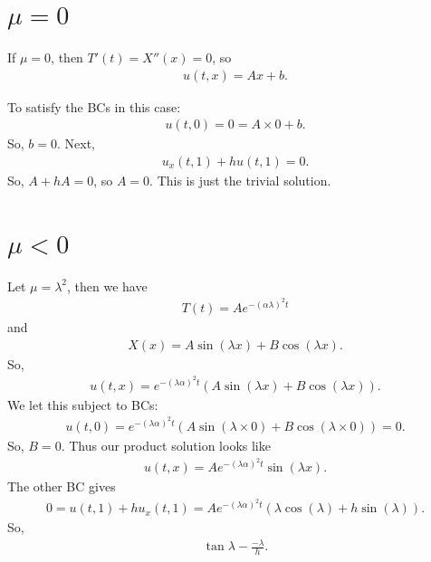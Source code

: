 \documentclass{book}
\theoremstyle{definition}
\begin{document}
\section{$\mu=0$}
If $\mu = 0$, then $T'(t) = X''(x) = 0$, so
\begin{align*}
u(t,x) = Ax+b.
\end{align*}

To satisfy the BCs in this case:
\begin{align*}
u(t,0) = 0 = A\times 0 + b.
\end{align*}
So, $b=0$. Next,
\begin{align*}
u_x(t,1) + hu(t,1) = 0.
\end{align*}
So, $A+hA = 0$, so $A=0$. This is just the trivial solution.

\section{$\mu <0$}
Let $\mu=\lambda^2$, then we have
\begin{align*}
T(t) = Ae^{-(\alpha \lambda)^2t}
\end{align*}
and
\begin{align*}
X(x) = A\sin(\lambda x) + B\cos(\lambda x).
\end{align*}
So,
\begin{align*}
u(t,x) = e^{-(\lambda\alpha)^2t}\left( A\sin(\lambda x) + B\cos(\lambda x) \right).
\end{align*}
We let this subject to BCs:
\begin{align*}
u(t,0) = e^{-(\lambda\alpha)^2t}\left( A\sin(\lambda\times 0) + B\cos(\lambda \times 0) \right) = 0.
\end{align*}
So, $B=0$. Thus our product solution looks like
\begin{align*}
u(t,x) = Ae^{-(\lambda\alpha)^2t}\sin(\lambda x).
\end{align*}
The other BC gives
\begin{align*}
0=u(t,1)+hu_x(t,1)=Ae^{-(\lambda\alpha)^2t}\left( \lambda\cos(\lambda) + h\sin(\lambda) \right).
\end{align*}
So,
\begin{align*}
\tan\lambda - \frac{-\lambda}{h}.
\end{align*}
\end{document}

